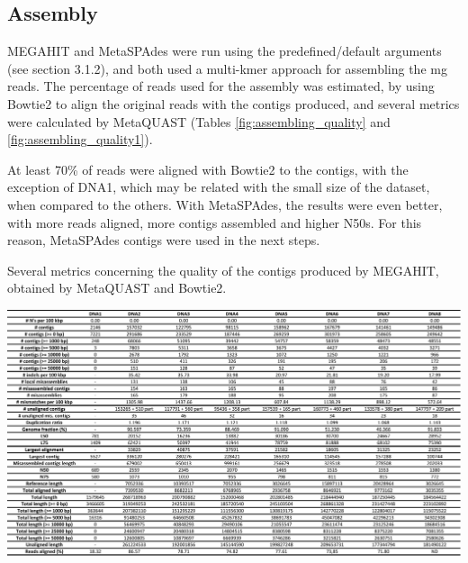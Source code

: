 \documentclass[
  oneside,
  11pt, a4paper,
  footinclude=true,
  headinclude=true,
  cleardoublepage=empty
]{scrbook}
\begin{document}
    \subsection{Assembly}
        
    MEGAHIT and MetaSPAdes were run using the predefined/default arguments (see section 3.1.2), and both used a multi-kmer approach for assembling the \gls{mg} reads. The percentage of reads used for the assembly was estimated, by using Bowtie2 to align the original reads with the contigs produced, and several metrics were calculated by MetaQUAST (Tables \ref{fig:assembling_quality} and \ref{fig:assembling_quality1}).
    
    At least 70\% of reads were aligned with Bowtie2 to the contigs, with the exception of DNA1, which may be related with the small size of the dataset, when compared to the others. With MetaSPAdes, the results were even better, with more reads aligned, more contigs assembled and higher N50s. For this reason, MetaSPAdes contigs were used in the next steps.
    
    \begin{table}[ph!]
    \caption{Several metrics concerning the quality of the contigs produced by MEGAHIT, obtained by MetaQUAST and Bowtie2.}
    \includegraphics[width=\columnwidth]{FiguresUndTables/Results/Assembling/assembly_results.pdf}
    \label{fig:assembling_quality}
    \end{table}
    
\end{document}
